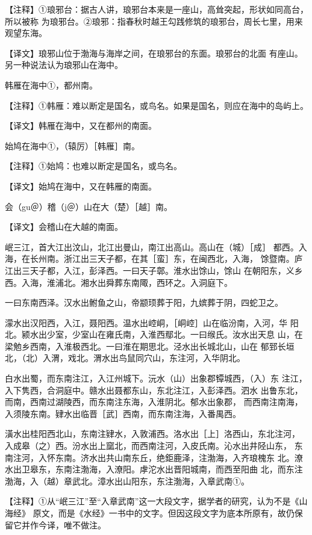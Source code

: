 \documentclass[a4paper,12pt,UTF8,twoside]{ctexbook}
\begin{document}
【注释】①琅邪台：据古人讲，琅邪台本来是一座山，高耸突起，形状如同高台，所以被称 为琅邪台。②琅邪：指春秋时越王勾践修筑的琅邪台，周长七里，用来观望东海。

【译文】琅邪山位于渤海与海岸之间，在琅邪台的东面。琅邪台的北面 有座山。另一种说法认为琅邪山在海中。

韩雁在海中①，都州南。

【注释】①韩雁：难以断定是国名，或鸟名。如果是国名，则应在海中的岛屿上。

【译文】韩雁在海中，又在都州的南面。

始鸠在海中①，（辕厉）［韩雁］南。

【注释】①始鸠：也难以断定是国名，或鸟名。

【译文】始鸠在海中，又在韩雁的南面。

会（gu＠）稽（j＠）山在大（楚）［越］南。

【译文】会稽山在大越的南面。

岷三江，首大江出汶山，北江出曼山，南江出高山。高山在（城）［成］ 都西。入海，在长州南。浙江出三天子都，在其［蛮］东，在闽西北，入海， 馀暨南。庐江出三天子都，入江，彭泽西。一曰天子鄣。淮水出馀山，馀山 在朝阳东，义乡西。入海，淮浦北。湘水出舜葬东南陬，西环之。入洞庭下。

一曰东南西泽。汉水出鲋鱼之山，帝颛顼葬于阳，九嫔葬于阴，四蛇卫之。

濛水出汉阳西，入江，聂阳西。温水出崆峒，［峒崆］山在临汾南，入河，华 阳北。颍水出少室，少室山在雍氏南，入淮西鄢北。一曰缑氏。汝水出天息 山，在梁勉乡西南，入淮极西北。一曰淮在期思北。泾水出长城北山，山在 郁郅长垣北，（北）入渭，戏北。渭水出鸟鼠同穴山，东注河，入华阴北。

白水出蜀，而东南注江，入江州城下。沅水（山）出象郡镡城西，（入）东 注江，入下隽西，合洞庭中。赣水出聂都东山，东北注江，入彭泽西。泗水 出鲁东北，而南，西南过湖陵西，而东南注东海，入淮阴北。郁水出象郡， 而西南注南海，入须陵东南。肄水出临晋［武］西南，而东南注海，入番禺西。

潢水出桂阳西北山，东南注肄水，入敦浦西。洛水出［上］洛西山，东北注河， 入成皋（之）西。汾水出上窳北，而西南注河，入皮氏南。沁水出井陉山东， 东南注河，入怀东南。济水出共山南东丘，绝鉅鹿泽，注渤海，入齐琅槐东 北。潦水出卫皋东，东南注渤海，入潦阳。虖沱水出晋阳城南，而西至阳曲 北，而东注渤海，入（越）章武北。漳水出山阳东，东注渤海，入章武南①。

【注释】①从“岷三江”至“入章武南”这一大段文字，据学者的研究，认为不是《山海经》 原文，而是《水经》一书中的文字。但因这段文字为底本所原有，故仍保留它并作今译，唯不做注。
\end{document}
